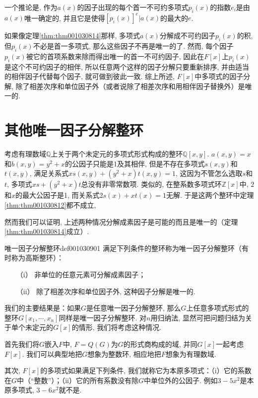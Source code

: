 一个推论是, 作为$a(x)$的因子出现的每个首一不可约多项式$p_i(x)$的指数$e_i$是由$a(x)$唯一确定的, 并且它是使得$[p_i(x)]^e|a(x)$的最大的$e$. 

如果像定理\ref{thm:thm001030814}那样, 多项式$a(x)$分解成不可约因子$p_i(x)$的积, 但$p_i(x)$不必是首一多项式, 那么这些因子不再是唯一的了. 然而, 每个因子$p_i(x)$被它的首项系数来除而得出唯一的首一不可约因子, 因此在$F[x]$上$p_i(x)$是这个不可约因子的相伴, 所以任意两个这样的因子分解只要重新排序, 并由适当的相伴因子代替每个因子, 就可做到彼此一致. 综上所述, $F[x]$中多项式的因子分解, 除了相差次序和单位因子外（或者说除了相差次序和用相伴因子替换外）是唯一的. 



\section{其他唯一因子分解整环}\label{section0010309}
考虑有理数域$\mathbb{Q}$上关于两个未定元的多项式形式构成的整环$\mathbb{Q}[x, y]$. $a(x,y) = x$和$b(x,y)=y^2+x$的公因子只能是1及其相伴, 但是不存在多项式$s(x,y)$和$t(x,y)$, 满足关系式$xs(x,y)+(y^2+x)t(x,y)=1$, 这因为不管怎么选取$s$和$t$, 多项式$xs+(y^2+x)t$总没有非零常数项. 类似的, 在整系数多项式环$\mathbb{Z}[x]$中, $2$和$x$的最大公因子是1, 而关系式$2s(x)+xt(x)=1$无解. 于是这两个整环中定理\ref{thm:thm001030812}都不成立, 

然而我们可以证明, 上述两种情况分解成素因子是可能的而且是唯一的（定理\ref{thm:thm001030814}成立）. 
\begin{definition}{唯一因子分解整环}{def001030901}
满足下列条件的整环称为唯一因子分解整环（有时称为高斯整环）：
\begin{enumerate}
\item[（i）] 非单位的任意元素可分解成素因子；
\item[（ii）] 除了相差次序和单位因子外, 这种因子分解是唯一的. 
\end{enumerate}
\end{definition}

我们的主要结果是：如果$G$是任意唯一因子分解整环, 那么$G$上任意多项式形式的整环$G[x_1, \cdots, x_n]$同样是唯一因子分解整环. 对$n$用归纳法, 显然可把问题归结为关于单个未定元的$G[x]$的情形, 我们将考虑这种情况. 

首先我们将$G$嵌入$F$中, $F=Q(G)$为$G$的形式商构成的域, 并同$G[x]$一起考虑$F[x]$. 我们可以典型地把$G$想象为整数环, 相应地把$F$想象为有理数域. 

其次, $F[x]$的多项式如果满足下列条件, 我们就称它为本原多项式：（i）它的系数在$G$中（“整数”）；（ii）它的所有系数没有除$G$中单位外的公因子. 例如$3-5x^2$是本原多项式, $3-6x^2$就不是. 

